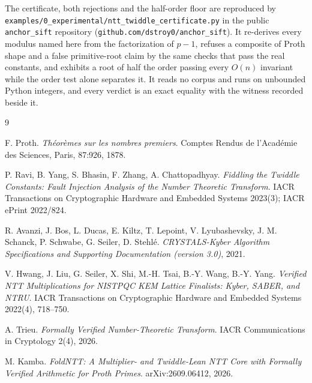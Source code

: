 \documentclass{article}
\begin{document}
The certificate, both rejections and the half-order floor are reproduced by \texttt{examples/0\_experimental/ntt\_twiddle\_certificate.py} in the public \texttt{anchor\_sift} repository (\texttt{github.com/dstroy0/anchor\_sift}). It re-derives every modulus named here from the factorization of \(p-1\), refuses a composite of Proth shape and a false primitive-root claim by the same checks that pass the real constants, and exhibits a root of half the order passing every \(O(n)\) invariant while the order test alone separates it. It reads no corpus and runs on unbounded Python integers, and every verdict is an exact equality with the witness recorded beside it.

\begin{thebibliography}{9}

F. Proth.
\emph{Th\'eor\`emes sur les nombres premiers}.
Comptes Rendus de l'Acad\'emie des Sciences, Paris, 87:926, 1878.

P. Ravi, B. Yang, S. Bhasin, F. Zhang, A. Chattopadhyay.
\emph{Fiddling the Twiddle Constants: Fault Injection Analysis of the Number Theoretic Transform}.
IACR Transactions on Cryptographic Hardware and Embedded Systems 2023(3); IACR ePrint 2022/824.

R. Avanzi, J. Bos, L. Ducas, E. Kiltz, T. Lepoint, V. Lyubashevsky, J. M. Schanck, P. Schwabe, G. Seiler, D. Stehl\'e.
\emph{CRYSTALS-Kyber Algorithm Specifications and Supporting Documentation (version 3.0)}, 2021.

V. Hwang, J. Liu, G. Seiler, X. Shi, M.-H. Tsai, B.-Y. Wang, B.-Y. Yang.
\emph{Verified NTT Multiplications for NISTPQC KEM Lattice Finalists: Kyber, SABER, and NTRU}.
IACR Transactions on Cryptographic Hardware and Embedded Systems 2022(4), 718--750.

A. Trieu.
\emph{Formally Verified Number-Theoretic Transform}.
IACR Communications in Cryptology 2(4), 2026.

M. Kamba.
\emph{FoldNTT: A Multiplier- and Twiddle-Lean NTT Core with Formally Verified Arithmetic for Proth Primes}.
arXiv:2609.06412, 2026.

\end{thebibliography}
\end{document}
